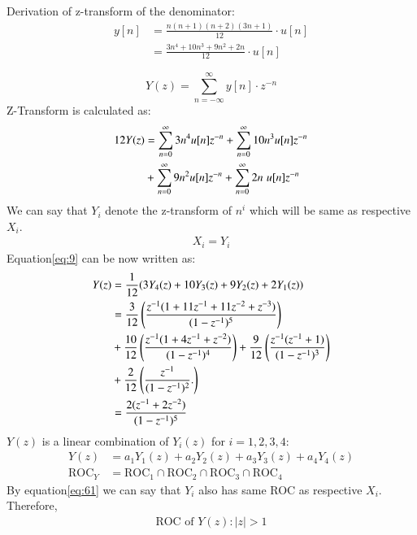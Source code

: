 \documentclass[journal,12pt,twocolumn]{IEEEtran}
\theoremstyle{remark}
\begin{document}
\begin{enumerate}[label=\alph*)]
Derivation of z-transform of the denominator:
\begin{align}
    y[n] &= \frac{n(n+1)(n+2)(3n+1)}{12}\cdot u[n]\\
         &= \frac{3n^4 + 10n^3 + 9n^2 + 2n}{12}\cdot u[n]\
\end{align}

\begin{equation}
    Y(z) = \sum_{n=-\infty}^\infty y[n]\cdot z^{-n}
\end{equation}
Z-Transform is calculated as:
\begin{align}\label{eq:9}
    12Y(z) &= \sum_{n=0}^\infty 3n^4u[n]z^{-n} +  \sum_{n=0}^\infty 10n^3u[n]z^{-n}\\ &+  \sum_{n=0}^\infty 9n^2u[n] z^{-n} +\sum_{n=0}^\infty 2n\hspace{3pt}u[n]z^{-n}\notag
\end{align}
We can say that $Y_i$ denote the z-transform of $n^{i}$ which will be same as respective $X_i$.
\begin{align}\label{eq:61}
    X_i=Y_i
\end{align}
Equation\eqref{eq:9} can be now written as:
\begin{align}
    Y(z) &=\frac{1}{12}(3Y_4(z) + 10Y_3(z) + 9Y_2(z) + 2Y_1(z)) \\
         &= \frac{3}{12}\left(\frac{z^{-1}(1+11z^{-1}+11z^{-2}+z^{-3})}{(1-z^{-1})^5}\right)\\ &+ \frac{10}{12}\left(\frac{z^{-1}(1+4z^{-1}+z^{-2})}{(1-z^{-1})^4}\right) 
         + \frac{9}{12}\left(\frac{z^{-1}(z^{-1}+1)}{(1-z^{-1})^3}\right)\notag \\ &+ \frac{2}{12}\left(\frac{z^{-1}}{(1-z^{-1})^2}.\right)\notag \\
         &= \frac{2(z^{-1}+2z^{-2})}{(1-z^{-1})^5}
\end{align}
\(Y(z)\) is a linear combination of \(Y_i(z)\) for \(i=1,2,3,4\):
\begin{align}
    Y(z) &= a_1 Y_1(z) + a_2 Y_2(z) + a_3 Y_3(z) + a_4 Y_4(z) \label{eq:linear_combination_Y} \\
    \text{ROC}_{Y} &= \text{ROC}_{1} \cap \text{ROC}_{2} \cap \text{ROC}_{3} \cap \text{ROC}_{4} \label{eq:roc_Y}
\end{align}
By equation\eqref{eq:61} we can say that $Y_i$ also has same ROC as respective $X_i$. Therefore,\\
\begin{align}
    \text{ROC of $Y(z)$} : |z|>1
\end{align}
\end{enumerate}
\end{document}
